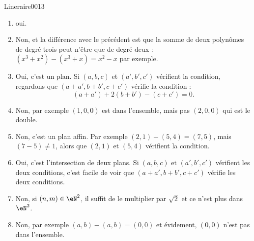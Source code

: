 \begin{corrige}{Lineraire0013}

	\begin{enumerate}

		\item
			oui.
		\item
			Non, et la différence avec le précédent est que la somme de deux polynômes de degré trois peut n'être que de degré deux : $(x^3+x^2)-(x^3+x)=x^2-x$ par exemple.

		\item
			Oui, c'est un plan. Si $(a,b,c)$ et $(a',b',c')$ vérifient la condition, regardons que $(a+a',b+b',c+c')$ vérifie la condition :
			\begin{equation}
				(a+a')+2(b+b')-(c+c')=0.
			\end{equation}
			
		\item
			Non, par exemple $(1,0,0)$ est dans l'ensemble, mais pas $(2,0,0)$ qui est le double.

		\item 
			Non, c'est un plan affin. Par exemple $(2,1)+(5,4)=(7,5)$, mais $(7-5)\neq 1$, alors que $(2,1)$ et $(5,4)$ vérifient la condition.

		\item
			Oui, c'est l'intersection de deux plans. Si $(a,b,c)$ et $(a',b',c')$ vérifient les deux conditions, c'est facile de voir que $(a+a',b+b',c+c')$ vérifie les deux conditions.

		\item
			Non, si $(n,m)\in\eN^2$, il suffit de le multiplier par $\sqrt{2}$ et ce n'est plus dans $\eN^2$.

		\item
			Non, par exemple $(a,b)-(a,b)=(0,0)$ et évidement, $(0,0)$ n'est pas dans l'ensemble.

	\end{enumerate}
	

\end{corrige}
